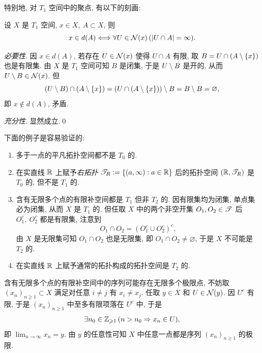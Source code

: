     特别地, 对 $ T_1 $ 空间中的聚点, 有以下的刻画:
    \begin{Proposition}
        设 $ X $ 是 $ T_1 $ 空间, $ x\in X,\ A\subset X $, 则
        \[
            x\in d(A)\Longleftrightarrow\forall U\in\mathcal{N}(x)\,(\left| U\cap A \right| =\infty).
        \]
    \end{Proposition}
    \begin{Proof}
        \textsl{必要性}. 因 $ x\in d(A) $, 若存在 $ U\in\mathcal{N}(x) $ 使得 $ U\cap A $ 有限, 取 $ B=U\cap(A\setminus\left\{ x \right\}) $ 也是有限集. 由 $ X $ 是 $ T_1 $ 空间可知 $ B $ 是闭集, 于是 $ U\setminus B $ 是开的, 从而 $ U\setminus B\in\mathcal{N}(x) $. 但
        \[
            (U\setminus B)\cap(A\setminus\left\{ x \right\})=(U\cap(A\setminus\left\{ x \right\}))\setminus B=B\setminus B=\varnothing,
        \]
        即 $ x\notin d(A) $, 矛盾.
        
        \textsl{充分性}. 显然成立.\qed
    \end{Proof}

    \begin{Example}
        下面的例子是容易验证的:
        \begin{enumerate}
            \item 多于一点的平凡拓扑空间都不是 $ T_0 $ 的.
            \item 在实直线 $ \mathbb{R} $ 上赋予\emph{右拓扑} $ \mathscr{T}_R:=\left\{ (a,\infty) : a\in\mathbb{R} \right\} $ 后的拓扑空间 $ (\mathbb{R},\mathscr{T}_R) $ 是 $ T_0 $ 的, 但不是 $ T_1 $ 的.
            \item 含有无限多个点的有限补空间都是 $ T_1 $ 但非 $ T_2 $ 的. 因有限集均为闭集, 单点集必为闭集, 从而 $ X $ 是 $ T_1 $ 的. 但任取 $ X $ 中的两个非空开集 $ O_1,O_2\in\mathscr{T} $ 后 $ O_1^c,\ O_2^c $ 都是有限集, 注意到
            \[
                O_1\cap O_2=(O_1^c\cup O_2^c)^c,
            \]
            由 $ X $ 是无限集可知 $ O_1\cap O_2 $ 也是无限集, 即 $ O_1\cap O_2\ne\varnothing $, 于是 $ X $ 不可能是 $ T_2 $ 的.
            \item 在实直线 $ \mathbb{R} $ 上赋予通常的拓扑构成的拓扑空间是 $ T_2 $ 的.
        \end{enumerate}
    \end{Example}

    \begin{Example}
        含有无限多个点的有限补空间中的序列可能存在无限多个极限点, 不妨取 $ (x_n)_{n\geqslant 1}\subset X $ 满足对任意 $ i\ne j $ 有 $ x_i\ne x_j $. 任取 $ y\in X $ 和 $ U\in\mathcal{N}(y) $. 因 $ U^c $ 有限, 于是 $ (x_n)_{n\geqslant 1} $ 中至多有限项落在 $ U^c $ 中, 于是
        \[
            \exists n_0\in\mathbb{Z}_{\geqslant 1}\,(n>n_0\Rightarrow x_n\in U),
        \]
        即 $ \lim_{n\to\infty}x_n=y $. 由 $ y $ 的任意性可知 $ X $ 中任意一点都是序列 $ (x_n)_{n\geqslant 1} $ 的极限.
    \end{Example}


